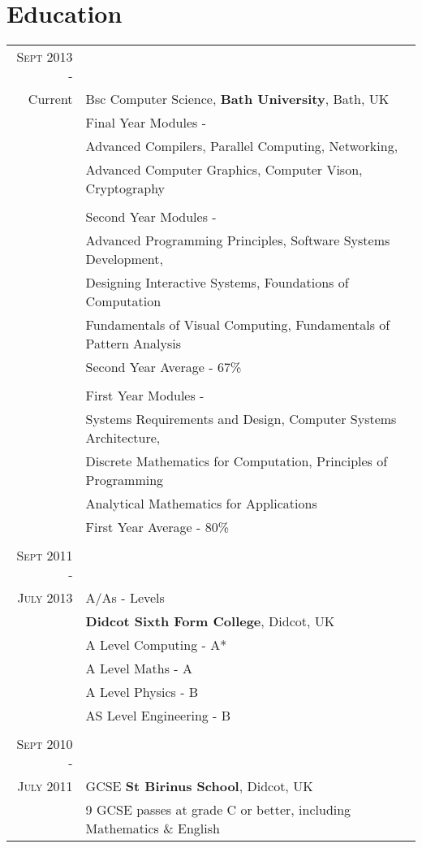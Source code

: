 \documentclass[a4paper,12pt]{article}
\begin{document}
\section{Education}
\begin{tabular}{rl}
 \textsc{Sept} 2013 -\\ Current & Bsc Computer Science, \textbf{Bath University}, Bath, UK\\
& Final Year Modules -\\
& \hspace{0.25cm} Advanced Compilers, Parallel Computing, Networking, \\ & \hspace{0.25cm} Advanced Computer Graphics, Computer Vison, Cryptography\\
& \\
& Second Year Modules -\\
& \hspace{0.25cm} Advanced Programming Principles, Software Systems Development, \\ & \hspace{0.25cm} Designing Interactive Systems, Foundations of Computation \\ & \hspace{0.25cm} Fundamentals of Visual Computing, Fundamentals of Pattern Analysis\\
& Second Year Average - 67\%\\
& \\
& First Year Modules -\\
& \hspace{0.25cm} Systems Requirements and Design, Computer Systems Architecture, \\ & \hspace{0.25cm} Discrete Mathematics for Computation, Principles of Programming\\ & \hspace{0.25cm} Analytical Mathematics for Applications\\
& First Year Average - 80\%\\
& \\
\textsc{Sept} 2011 -\\ \textsc{July} 2013 & A/As - Levels \\& \normalsize\textbf{Didcot Sixth Form College}, Didcot, UK\\
& A Level Computing - A*\\
& A Level Maths - A\\
& A Level Physics - B\\
& AS Level Engineering - B\\&\\
\textsc{Sept} 2010 -\\ \textsc{July} 2011& GCSE \textbf{St Birinus School}, Didcot, UK\\
&9 GCSE passes at grade C or better, including Mathematics \& English \\
\end{tabular}
\end{document}
